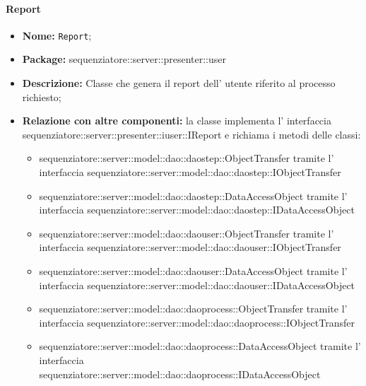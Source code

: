 \paragraph{Report}
	\begin{itemize}
		\item \textbf{Nome:} \texttt{Report};
		\item \textbf{Package:} sequenziatore::server::presenter::user
		\item \textbf{Descrizione:} Classe che genera il report dell' utente riferito al processo richiesto;
		\item \textbf{Relazione con altre componenti:} la classe implementa l' interfaccia sequenziatore::server::presenter::iuser::IReport e richiama i metodi delle classi:
		\begin{itemize}
			\item sequenziatore::server::model::dao::daostep::ObjectTransfer tramite l' interfaccia sequenziatore::server::model::dao::daostep::IObjectTransfer
			\item sequenziatore::server::model::dao::daostep::DataAccessObject tramite l' interfaccia sequenziatore::server::model::dao::daostep::IDataAccessObject
			\item sequenziatore::server::model::dao::daouser::ObjectTransfer tramite l' interfaccia sequenziatore::server::model::dao::daouser::IObjectTransfer
			\item sequenziatore::server::model::dao::daouser::DataAccessObject tramite l' interfaccia sequenziatore::server::model::dao::daouser::IDataAccessObject
			\item sequenziatore::server::model::dao::daoprocess::ObjectTransfer tramite l' interfaccia sequenziatore::server::model::dao::daoprocess::IObjectTransfer
			\item sequenziatore::server::model::dao::daoprocess::DataAccessObject tramite l' interfaccia sequenziatore::server::model::dao::daoprocess::IDataAccessObject
		\end{itemize}
	\end{itemize}
